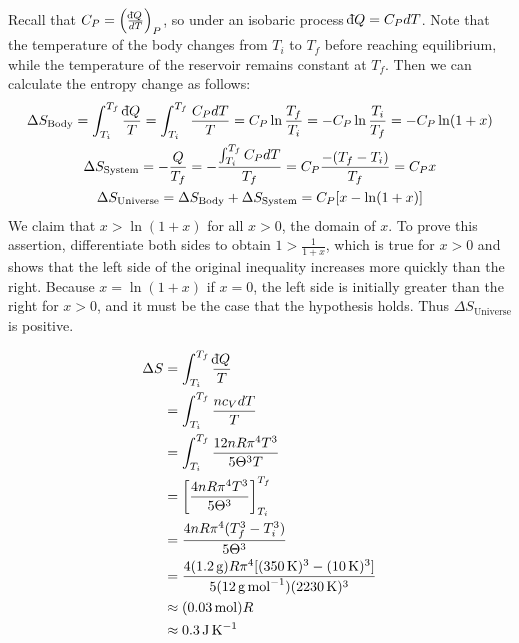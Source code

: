 \documentclass[a4paper,12pt]{article}
\def\dbar{{\mathchar'26\mkern-12mu \mathrm{d}}}
\begin{document}
\begin{enumerate}[label=\textbf{[\arabic*]}]
    \item
        Recall that $C_P = \left( \frac{\dbar Q}{dT} \right)_P$, so under an isobaric process $\dbar Q = C_P dT$. Note that the temperature of the body changes from $T_i$ to $T_f$ before reaching equilibrium, while the temperature of the reservoir remains constant at $T_f$. Then we can calculate the entropy change as follows:
        \begin{gather*}
            \Delta S_{\text{Body}} = \int_{T_i}^{T_f} \frac{\dbar Q}{T} = \int_{T_i}^{T_f} \frac{C_P dT}{T} = C_P \ln \frac{T_f}{T_i} = -C_P \ln \frac{T_i}{T_f} = -C_P \ln(1 + x) \\
            \Delta S_{\text{System}} = -\frac{Q}{T_f} = -\frac{\int_{T_i}^{T_f} C_P dT}{T_f} = C_P \frac{-(T_f - T_i)}{T_f} = C_P x\\
            \Delta S_{\text{Universe}} = \Delta S_{\text{Body}} + \Delta S_{\text{System}} = C_P [x - \ln(1 + x)]
        \end{gather*}
        We claim that $x > \ln(1 + x)$ for all $x > 0$, the domain of $x$. To prove this assertion, differentiate both sides to obtain $1 > \frac{1}{1 + x}$, which is true for $x > 0$ and shows that the left side of the original inequality increases more quickly than the right. Because $x = \ln(1 + x)$ if $x = 0$, the left side is initially greater than the right for $x > 0$, and it must be the case that the hypothesis holds. Thus $\Delta S_{\text{Universe}}$ is positive.

    \item
        \begin{align*}
            \Delta S &= \int_{T_i}^{T_f} \frac{\dbar Q}{T} \\
            &= \int_{T_i}^{T_f} \frac{n c_V dT}{T} \\
            &= \int_{T_i}^{T_f} \frac{12nR \pi^4 T^3}{5 \Theta^3 T} \\
            &= \left[ \frac{4nR \pi^4 T^3}{5 \Theta^3} \right]_{T_i}^{T_f} \\
            &= \frac{4nR \pi^4 (T_f^3 - T_i^3)}{5 \Theta^3} \\
            &= \frac{4(\SI{1.2}{\g}) R \pi^4 [(\SI{350}{K})^3 - (\SI{10}{K})^3]}{5(\SI{12}{\g\per\mol})(\SI{2230}{K})^3} \\
            &\approx (\SI{0.03}{\mol}) R \\
            &\approx \SI{0.3}{\J\per\K}
        \end{align*}


\end{enumerate}
\end{document}
